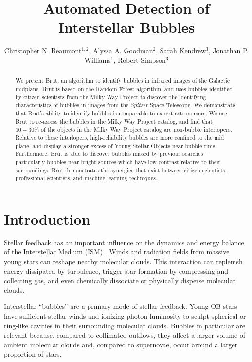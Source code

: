 \documentclass[preprint]{aastex}
\begin{document}
\title{Automated Detection of Interstellar Bubbles}
\author{Christopher N. Beaumont$^{1,2}$, Alyssa A. Goodman$^2$, Sarah Kendrew$^3$, Jonathan P. Williams$^1$, Robert Simpson$^3$}

\begin{abstract}
We present Brut, an algorithm to identify bubbles in infrared images of the Galactic midplane. Brut is based on the Random Forest algorithm, and uses bubbles identified by citizen scientists from the Milky Way Project to discover the identifying characteristics of bubbles in images from the \textit{Spitzer} Space Telescope. We demonstrate that Brut's ability to identify bubbles is comparable to expert astronomers. We use Brut to re-assess the bubbles in the Milky Way Project catalog, and find that $10-30\%$ of the objects in the Milky Way Project catalog are non-bubble interlopers. Relative to these interlopers, high-reliability bubbles are more confined to the mid plane, and display a stronger excess of Young Stellar Objects near bubble rims. Furthermore, Brut is able to discover bubbles missed by previous searches -- particularly bubbles near bright sources which have low contrast relative to their surroundings. Brut demonstrates the synergies that exist between citizen scientists, professional scientists, and machine learning techniques.
\end{abstract}

\section{Introduction}
\label{sec:intro}
Stellar feedback has an important influence on the dynamics and energy balance of the Interstellar Medium (ISM) \citep{Zinnecker07}. Winds and radiation fields from massive young stars can reshape nearby molecular clouds. This interaction can replenish energy dissipated by turbulence, trigger star formation by compressing and collecting gas, and even chemically dissociate or physically disperse molecular clouds.

Interstellar ``bubbles'' are a primary mode of stellar feedback. Young OB stars have sufficient stellar winds and ionizing photon luminosity to sculpt spherical or ring-like cavities in their surrounding molecular clouds. Bubbles in particular are relevant because, compared to collimated outflows, they affect a larger volume of ambient molecular clouds and, compared to supernovae, occur around a larger proportion of stars.
\end{document}
